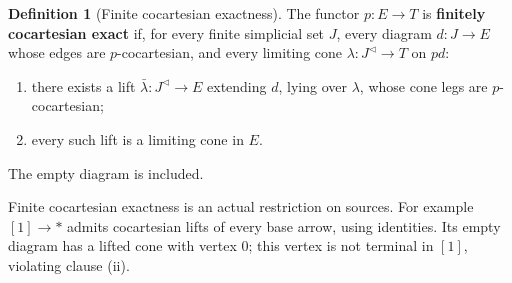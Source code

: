 \documentclass[oneside]{article}
\theoremstyle{plain}
\theoremstyle{definition}
\newtheorem{definition}[theorem]{Definition}
\theoremstyle{remark}
\begin{document}
\begin{definition}[Finite cocartesian exactness]\label{thz:def:exact}
The functor $p:E\to T$ is \textbf{finitely cocartesian exact} if, for every
finite simplicial set $J$, every diagram $d:J\to E$ whose edges are
$p$-cocartesian, and every limiting cone
$\lambda:J^{\triangleleft}\to T$ on $pd$:
\begin{enumerate}\renewcommand{\labelenumi}{(\roman{enumi})}
\item there exists a lift $\bar\lambda:J^{\triangleleft}\to E$ extending
      $d$, lying over $\lambda$, whose cone legs are $p$-cocartesian;
\item every such lift is a limiting cone in $E$.
\end{enumerate}
The empty diagram is included.
\end{definition}

Finite cocartesian exactness is an actual restriction on sources.
For example $[1]\to *$ admits cocartesian lifts of every base arrow,
using identities. Its empty diagram has a lifted cone with vertex
$0$; this vertex is not terminal in $[1]$, violating clause (ii).
\end{document}

